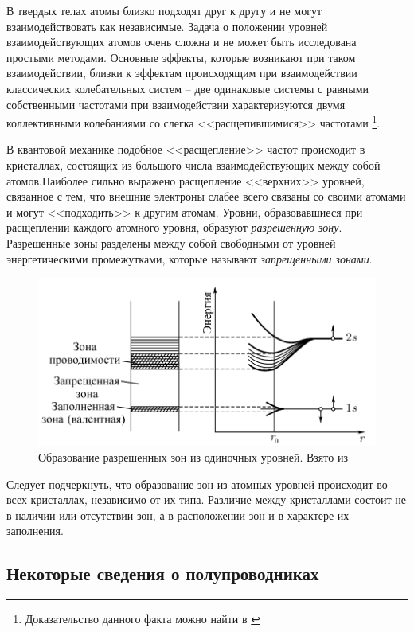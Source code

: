 \documentclass[a4paper,12pt]{article}
\begin{document}
В твердых телах атомы близко подходят друг к другу и не могут взаимодействовать как независимые. Задача о положении уровней взаимодействующих атомов очень сложна и не может быть исследована простыми методами. Основные эффекты, которые возникают при таком взаимодействии, близки к эффектам происходящим при взаимодействии классических колебательных систем -- две одинаковые системы с равными собственными частотами при взаимодействии характеризуются двумя коллективными колебаниями со слегка <<расщепившимися>> частотами \footnote{Доказательство данного факта можно найти в \cite{goldin}}. 

В квантовой механике подобное <<расщепление>> частот происходит в кристаллах, состоящих из большого числа взаимодействующих между собой атомов.Наиболее сильно выражено расщепление <<верхних>>  уровней, связанное с тем, что внешние электроны слабее всего связаны со своими атомами и могут <<подходить>> к другим атомам. Уровни, образовавшиеся при расщеплении каждого атомного уровня, образуют \textit{разрешенную зону}. Разрешенные зоны разделены между собой свободными от уровней энергетическими промежутками, которые называют \textit{запрещенными зонами}.

\begin{figure}[h!]
	\centering
	\includegraphics[width=\linewidth]{zones_in_solids}
	\caption{Образование разрешенных зон из одиночных уровней. Взято из \cite{goldin}}
\end{figure}

Следует подчеркнуть, что образование зон из атомных уровней происходит во всех кристаллах, независимо от их типа. Различие между кристаллами состоит не в наличии или отсутствии зон, а в расположении зон и в характере их заполнения.

\pagebreak

\subsection*{Некоторые сведения о полупроводниках}
\end{document}
